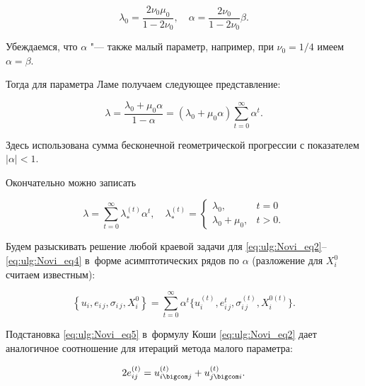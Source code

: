 $$

\lambda _{0} =\frac{2\nu _{0} \mu _{0} }{1-2\nu _{0} } ,\quad \alpha =\frac{2\nu _{0} }{1-2\nu _{0} } \beta .

$$ 

Убеждаемся, что  $\alpha $ "--- также малый параметр, например, при $\nu _{0} =1/4$ имеем $\alpha =\beta $. 

Тогда для параметра Ламе получаем следующее представление: 

\[

\lambda =\frac{\lambda _{0} +\mu _{0} \alpha }{1-\alpha } =(\lambda _{0} +\mu _{0} \alpha )\sum _{t=0}^{\infty }\alpha ^{t}  .

\] 

Здесь использована сумма бесконечной геометрической прогрессии с показателем $|\alpha| <1$. 

Окончательно можно записать

\[

\lambda =\sum _{t=0}^{\infty }\lambda _{*}^{(t)} \alpha ^{t}  ,\quad \lambda _{*}^{(t)} =

\left\{\begin{array}{cl} \lambda _{0} , &t=0  \\ 

\lambda _{0} +\mu _{0} , &t>0. 

\end{array}\right. 

\] 



Будем разыскивать решение любой краевой задачи для \eqref{eq:ulg:Novi_eq2}--\eqref{eq:ulg:Novi_eq4} в~форме асимптотических рядов по $\alpha $ (разложение для $X_{i}^{0} $ считаем известным): 

\begin{equation} \label{eq:ulg:Novi_eq5} 

\left\{u_{i} ,e _{i\, j} ,\sigma _{i\, j} ,X_{i}^{0} \right\}=

\sum _{t=0}^{\infty }\alpha ^{t} \bigl\{u_{i}^{(t)} ,e _{i\, j}^{t} ,\sigma _{i\, j}^{(t)} ,X_{i}^{0(t)} \bigr\} .

\end{equation} 

Подстановка \eqref{eq:ulg:Novi_eq5} в~формулу Коши \eqref{eq:ulg:Novi_eq2} дает аналогичное соотношение для итераций метода малого параметра:

\[ 

2 e _{i j}^{(t)} =u_{i\bigcom j}^{(t)} +u_{j\bigcom i}^{(t)} .

\] 

